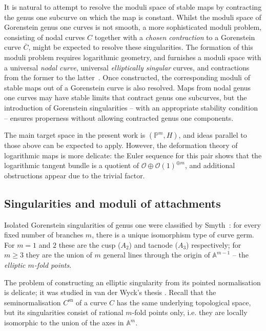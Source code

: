\documentclass[11pt]{amsart}
\newcommand{\PP}{\mathbb P}
\newcommand{\Aaff}{\mathbb{A}}
\theoremstyle{definition}
\theoremstyle{definition}
\begin{document}
It is natural to attempt to resolve the moduli space of stable maps by contracting the genus one subcurve on which the map is constant. Whilst the moduli space of Gorenstein genus one curves is not smooth, a more sophisticated moduli problem, consisting of nodal curves $C$ together with a \textit{chosen contraction} to a Gorenstein curve $\bar{C}$, might be expected to resolve these singularities. The formation of this moduli problem requires logarithmic geometry, and furnishes a moduli space with a universal \textit{nodal curve}, universal \textit{elliptically singular} curves, and contractions from the former to the latter~\cite[Section~3]{RSPW}. Once constructed, the corresponding moduli of stable maps out of a Gorenstein curve is also resolved. Maps from nodal genus one curves may have stable limits that contract genus one subcurves, but the introduction of Gorenstein singularities -- with an appropriate stability condition -- ensures properness without allowing contracted genus one components. 

The main target space in the present work is $(\mathbb P^m,H)$, and ideas parallel to those above can be expected to apply. However, the deformation theory of logarithmic maps is more delicate: the Euler sequence for this pair shows that the logarithmic tangent bundle is a quotient of $\mathcal O\oplus\mathcal O(1)^{\oplus m}$, and additional obstructions appear due to the trivial factor. %

\subsection{Singularities and moduli of attachments}\label{S:ellsing} Isolated Gorenstein singularities of genus one were classified by Smyth~\cite{SMY1}: for every fixed number of branches $m$, there is a unique isomorphism type of curve germ. For $m=1$ and $2$ these are the cusp ($A_2$) and tacnode ($A_3$) respectively; for $m\geq 3$ they are the union of $m$ general lines through the origin of $\Aaff^{m-1}$ -- the \emph{elliptic $m$-fold points}.

The problem of constructing an elliptic singularity from its pointed normalisation is delicate; it was studied in van der Wyck's thesis \cite{vdW}. Recall that the seminormalisation $C^\text{sn}$ of a curve $C$ has the same underlying topological space, but its singularities consist of rational $m$-fold points only, i.e. they are locally isomorphic to the union of the axes in $\Aaff^m$.
\end{document}
